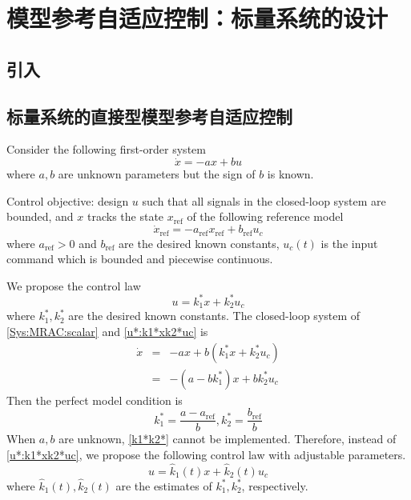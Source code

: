 \section{模型参考自适应控制：标量系统的设计}\label{4Bref}

\subsection{引入}

\subsection{标量系统的直接型模型参考自适应控制}
Consider the following first-order system
\begin{equation}
  \dot{x} = - a  x + b  u \label{Sys:MRAC:scalar}
\end{equation}
where $a, b$ are unknown parameters but the sign of $b$ is known.

Control objective: design $u$ such that all signals in the closed-loop system
are bounded, and $x$ tracks the state $x_{\ensuremath{\operatorname{ref}}}$ of
the following reference model
\begin{equation}
  \dot{x}_{\ensuremath{\operatorname{ref}}} = -
  a_{\ensuremath{\operatorname{ref}}} x_{\ensuremath{\operatorname{ref}}} +
  b_{\ensuremath{\operatorname{ref}}} u_c \label{Sys:MRAC:scalar:ref}
\end{equation}
where $a_{\ensuremath{\operatorname{ref}}} > 0$ and
$b_{\ensuremath{\operatorname{ref}}}$ are the desired known constants, $u_c
(t)$ is the input command which is bounded and piecewise continuous.

We propose the control law
\begin{equation}
  u = k^{\ast}_1 x + k^{\ast}_2 u_c \label{u*:k1*xk2*uc}
\end{equation}
where $k^{\ast}_1, k^{\ast}_2$ are the desired known constants. The
closed-loop system of \eqref{Sys:MRAC:scalar} and \eqref{u*:k1*xk2*uc} is
\begin{eqnarray*}
  \dot{x} & = & - a  x + b  (k^{\ast}_1 x + k^{\ast}_2 u_c)\\
  & = & - (a - b  k^{\ast}_1)  x + b  k^{\ast}_2 u_c
\end{eqnarray*}
Then the perfect model condition is
\begin{equation}
  k^{\ast}_1 = \frac{a - a_{\ensuremath{\operatorname{ref}}}}{b}, k^{\ast}_2 =
  \frac{b_{\ensuremath{\operatorname{ref}}}}{b} \label{k1*k2*}
\end{equation}
When $a, b$ are unknown, \eqref{k1*k2*} cannot be implemented. Therefore,
instead of \eqref{u*:k1*xk2*uc}, we propose the following control law with
adjustable parameters.
\begin{equation}
  u = \hat{k}_1 (t) x + \hat{k}_2 (t) u_c \label{u:k1xk2uc}
\end{equation}
where $\hat{k}_1 (t), \hat{k}_2 (t)$ are the estimates of $k^{\ast}_1,
k^{\ast}_2$, respectively.

